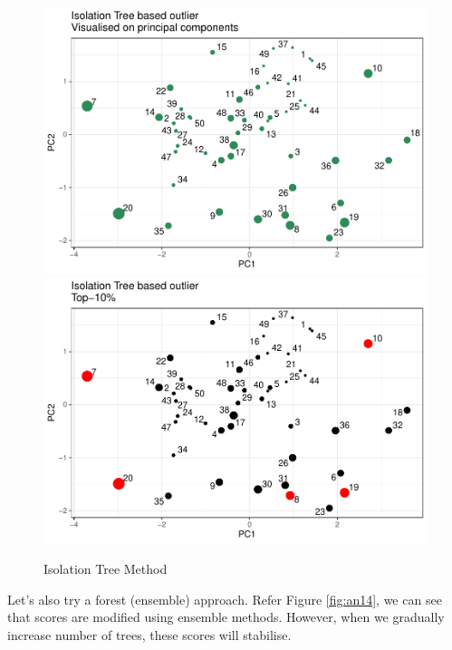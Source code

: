 \documentclass[
]{book}
\begin{document}
\begin{figure}

{\centering \includegraphics[width=0.48\linewidth]{DauR_files/figure-latex/an24-1} \includegraphics[width=0.48\linewidth]{DauR_files/figure-latex/an24-2} 

}

\caption{Isolation Tree Method}\label{fig:an24}
\end{figure}

Let's also try a forest (ensemble) approach. Refer Figure \ref{fig:an14}, we can see that scores are modified using ensemble methods. However, when we gradually increase number of trees, these scores will stabilise.
\end{document}
